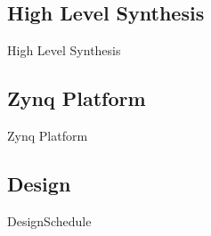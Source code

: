 \subsection{High Level Synthesis}
\begin{frame}{High Level Synthesis}
\end{frame}

\subsection{Zynq Platform}
\begin{frame}{Zynq Platform}
\end{frame}

\subsection{Design}
\begin{frame}{Design}{Schedule}
\end{frame}
